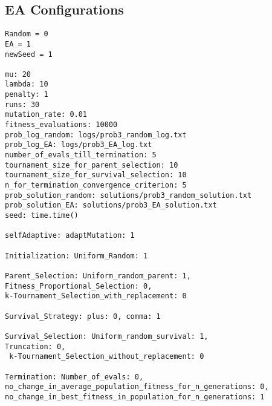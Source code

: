 \documentclass[•]{article}
\begin{document}
\subsection{EA Configurations}
\begin{lstlisting}
Random = 0
EA = 1
newSeed = 1

mu: 20
lambda: 10
penalty: 1
runs: 30
mutation_rate: 0.01
fitness_evaluations: 10000
prob_log_random: logs/prob3_random_log.txt
prob_log_EA: logs/prob3_EA_log.txt
number_of_evals_till_termination: 5
tournament_size_for_parent_selection: 10
tournament_size_for_survival_selection: 10
n_for_termination_convergence_criterion: 5
prob_solution_random: solutions/prob3_random_solution.txt
prob_solution_EA: solutions/prob3_EA_solution.txt
seed: time.time()

selfAdaptive: adaptMutation: 1

Initialization: Uniform_Random: 1

Parent_Selection: Uniform_random_parent: 1, Fitness_Proportional_Selection: 0, 
k-Tournament_Selection_with_replacement: 0

Survival_Strategy: plus: 0, comma: 1

Survival_Selection: Uniform_random_survival: 1, 
Truncation: 0,
 k-Tournament_Selection_without_replacement: 0

Termination: Number_of_evals: 0, no_change_in_average_population_fitness_for_n_generations: 0, no_change_in_best_fitness_in_population_for_n_generations: 1
\end{lstlisting}
\end{document}
